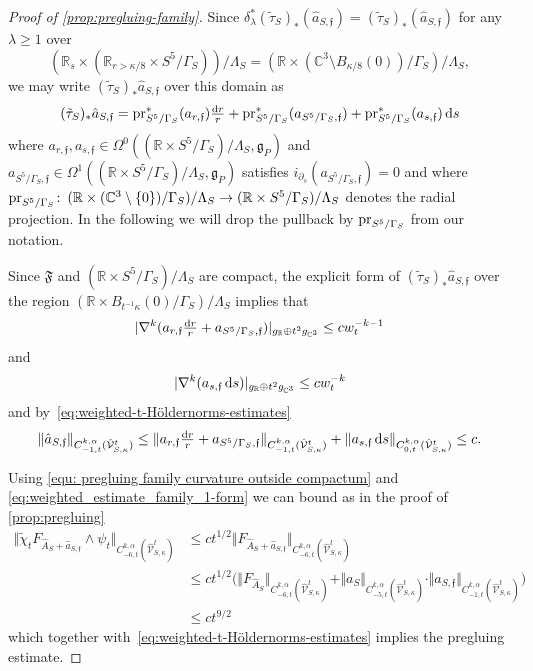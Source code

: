 \documentclass[11pt,a4paper]{scrartcl}
\newcommand*\diff{\mathop{}\!\textup{d}}
\newcommand{\col}{\colon \thinspace}
\newcommand{\pr}{\textup{pr}}
\newcommand{\VertWHt}[3]{\Vert_{C^{{#1},\alpha}_{{#2},t}{#3}}}
\numberwithin{equation}{section}
\theoremstyle{plain}
\theoremstyle{definition}
\theoremstyle{remark}
\begin{document}
\begin{proof}[Proof of \autoref{prop:pregluing-family}]
Since $\delta_{\lambda}^*(\tilde{\tau}_S)_*(\hat{a}_{S,\mathfrak{f}}) = (\tilde{\tau}_S)_*(\hat{a}_{S,\mathfrak{f}})$ for any $\lambda\geq 1$ over \[(\mathbb{R}_s\times (\mathbb{R}_{r>\kappa/8} \times S^5/\Gamma_S))/\Lambda_S = (\mathbb{R}\times (\mathbb{C}^3\setminus B_{\kappa/8}(0))/\Gamma_S)/\Lambda_S,\] we may write $(\tilde{\tau}_S)_*\hat{a}_{S,\mathfrak{f}}$ over this domain as \[(\tilde{\tau}_S)_*\hat{a}_{S,\mathfrak{f}} = \pr_{S^5/\Gamma_S}^*(a_{r,\mathfrak{f}}) \tfrac{\diff r}{r} + \pr_{S^5/\Gamma_S}^*(a_{S^5/\Gamma_S,\mathfrak{f}}) + \pr_{S^5/\Gamma_S}^*(a_{s,\mathfrak{f}}) \diff s \] where $a_{r,\mathfrak{f}},a_{s,\mathfrak{f}} \in \Omega^0((\mathbb{R}\times S^5/\Gamma_S)/\Lambda_S,\mathfrak{g}_{P})$ and $a_{S^5/\Gamma_S,\mathfrak{f}}\in \Omega^1((\mathbb{R}\times S^5/\Gamma_S)/\Lambda_S,\mathfrak{g}_{P})$ satisfies $i_{\partial_s}(a_{S^5/\Gamma_S,\mathfrak{f}})=0$ and where $\pr_{S^5/\Gamma_S}\col (\mathbb{R}\times (\mathbb{C}^3\setminus \{0\})/\Gamma_S)/\Lambda_S \to (\mathbb{R}\times S^5/\Gamma_S)/\Lambda_S$ denotes the radial projection. In the following we will drop the pullback by $\pr_{S^5/\Gamma_S}$ from our notation. 

Since $\mathfrak{F}$ and $(\mathbb{R}\times S^5/\Gamma_S)/\Lambda_S$ are compact, the explicit form of $(\tilde{\tau}_S)_*\hat{a}_{S,\mathfrak{f}}$ over the region $(\mathbb{R}\times B_{t^{-1}\kappa}(0)/\Gamma_S)/\Lambda_S$ implies that \[ \vert \nabla^k (a_{r,\mathfrak{f}} \tfrac{\diff r}{r} + a_{S^5/\Gamma_S,\mathfrak{f}}) \vert_{g_{\mathbb{R}}\oplus t^2 g_{\mathbb{C}^3}} \leq c w_t^{-k-1}  \] and \[ \vert \nabla^k (a_{s,\mathfrak{f}} \diff s) \vert_{g_{\mathbb{R}}\oplus t^2 g_{\mathbb{C}^3}} \leq c w_t^{-k} \] and by~\eqref{eq:weighted-t-Höldernorms-estimates}
\begin{equation}\label{eq:weighted_estimate_family_1-form}
\Vert \hat{a}_{S,\mathfrak{f}} \VertWHt{k}{-1}{(\hat{\mathcal{V}}_{S,\kappa}^t)} \leq \Vert a_{r,\mathfrak{f}} \tfrac{\diff r}{r} + a_{S^5/\Gamma_S,\mathfrak{f}} \VertWHt{k}{-1}{(\hat{\mathcal{V}}_{S,\kappa}^t)} + \Vert a_{s,\mathfrak{f}} \diff s \VertWHt{k}{0}{(\hat{\mathcal{V}}_{S,\kappa}^t)} \leq c. 
\end{equation} 

Using \eqref{equ: pregluing family curvature outside compactum} and \eqref{eq:weighted_estimate_family_1-form} we can bound as in the proof of \autoref{prop:pregluing}
\begin{align*}
\Vert \widetilde{\chi}_t F_{\hat{A}_S+\hat{a}_{S,\mathfrak{f}}} \wedge \psi_t \VertWHt{k}{-6}{(\hat{\mathcal{V}}_{S,\kappa}^t)} & \leq c t^{1/2} \Vert F_{\hat{A}_S+\hat{a}_{S,\mathfrak{f}}} \VertWHt{k}{-6}{(\hat{\mathcal{V}}_{S,\kappa}^t)} \\
& \leq ct^{1/2} \big( \Vert F_{\hat{A}_S} \VertWHt{k}{-6}{(\hat{\mathcal{V}}_{S,\kappa}^t)} + \Vert a_S \VertWHt{k}{-5}{(\hat{\mathcal{V}}_{S,\kappa}^t)} \cdot \Vert \hat{a}_{S,\mathfrak{f}} \VertWHt{k}{-1}{(\hat{\mathcal{V}}_{S,\kappa}^t)} \big) \\
&\leq c t^{9/2}
\end{align*}
which together with~\eqref{eq:weighted-t-Höldernorms-estimates} implies the pregluing estimate.


\end{proof}
\end{document}
